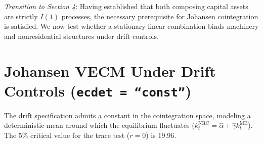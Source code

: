 \documentclass[11pt,a4paper]{article}
\begin{document}
\textit{Transition to Section 4}: Having established that both composing capital assets are strictly $I(1)$ processes, the necessary prerequisite for Johansen cointegration is satisfied. We now test whether a stationary linear combination binds machinery and nonresidential structures under drift controls.

\FloatBarrier
\section{Johansen VECM Under Drift Controls (\texttt{ecdet = ``const''})}

The drift specification admits a constant in the cointegration space, modeling a deterministic mean around which the equilibrium fluctuates ($k_t^{\text{NRC}} = \hat{\alpha} + \hat{\gamma} k_t^{\text{ME}}$). The 5\% critical value for the trace test ($r=0$) is 19.96.
\end{document}
